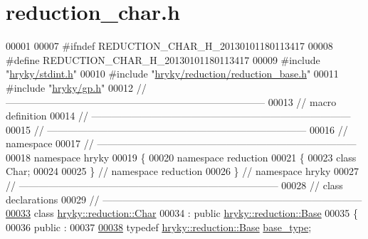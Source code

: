 \hypertarget{reduction__char_8h_source}{\section{reduction\-\_\-char.\-h}
}

\begin{DoxyCode}
00001 
00007 \textcolor{preprocessor}{#ifndef REDUCTION\_CHAR\_H\_20130101180113417}
00008 \textcolor{preprocessor}{}\textcolor{preprocessor}{#define REDUCTION\_CHAR\_H\_20130101180113417}
00009 \textcolor{preprocessor}{}\textcolor{preprocessor}{#include "\hyperlink{stdint_8h}{hryky/stdint.h}"}
00010 \textcolor{preprocessor}{#include "\hyperlink{reduction__base_8h}{hryky/reduction/reduction_base.h}"}
00011 \textcolor{preprocessor}{#include "\hyperlink{gp_8h}{hryky/gp.h}"}
00012 \textcolor{comment}{//
      ------------------------------------------------------------------------------}
00013 \textcolor{comment}{// macro definition}
00014 \textcolor{comment}{//
      ------------------------------------------------------------------------------}
00015 \textcolor{comment}{//
      ------------------------------------------------------------------------------}
00016 \textcolor{comment}{// namespace}
00017 \textcolor{comment}{//
      ------------------------------------------------------------------------------}
00018 \textcolor{keyword}{namespace }hryky
00019 \{
00020 \textcolor{keyword}{namespace }reduction
00021 \{
00023     \textcolor{keyword}{class }Char;
00024 
00025 \} \textcolor{comment}{// namespace reduction}
00026 \} \textcolor{comment}{// namespace hryky}
00027 \textcolor{comment}{//
      ------------------------------------------------------------------------------}
00028 \textcolor{comment}{// class declarations}
00029 \textcolor{comment}{//
      ------------------------------------------------------------------------------}
\hypertarget{reduction__char_8h_source_l00033}{}\hyperlink{classhryky_1_1reduction_1_1_char}{00033} \textcolor{comment}{}\textcolor{keyword}{class }\hyperlink{classhryky_1_1reduction_1_1_char}{hryky::reduction::Char}
00034     : \textcolor{keyword}{public} \hyperlink{classhryky_1_1reduction_1_1_base}{hryky::reduction::Base}
00035 \{
00036 \textcolor{keyword}{public} :
00037 
\hypertarget{reduction__char_8h_source_l00038}{}\hyperlink{classhryky_1_1reduction_1_1_char_a939ea3c855793d5f5ea142790b165770}{00038}     \textcolor{keyword}{typedef} \hyperlink{classhryky_1_1reduction_1_1_base}{hryky::reduction::Base} \hyperlink{classhryky_1_1reduction_1_1_char_a939ea3c855793d5f5ea142790b165770}{base_type};

\end{DoxyCode}
